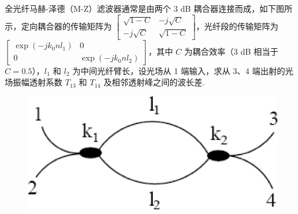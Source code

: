 \documentclass{assignment}
\begin{document}
\begin{prob}
    全光纤马赫-泽德（M-Z）滤波器通常是由两个 $3$ dB 耦合器连接而成，如下图所示，定向耦合器的传输矩阵为 $\begin{bmatrix}
        \sqrt{1-C}&-j\sqrt{C}\\
        -j\sqrt{C}&\sqrt{1-C}
    \end{bmatrix}$，光纤段的传输矩阵为 $\begin{bmatrix}
        \exp(-jk_0nl_1)&0\\
        0&\exp(-jk_0nl_2)
    \end{bmatrix}$，其中 $C$ 为耦合效率（$3$ dB 相当于 $C=0.5$），$l_1$ 和 $l_2$ 为中间光纤臂长，设光场从 1 端输入，求从 3、4 端出射的光场振幅透射系数 $T_{13}$ 和 $T_{14}$ 及相邻透射峰之间的波长差.
    \begin{figure}[h]
        \centering
        \includegraphics[width=.5\columnwidth]{4-3.png}
    \end{figure}
\end{prob}
\end{document}
